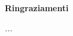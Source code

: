 \thispagestyle{empty}

\begin{center}
  {\bf \Huge Ringraziamenti}
\end{center}

\vspace{4cm}
\emph{...}